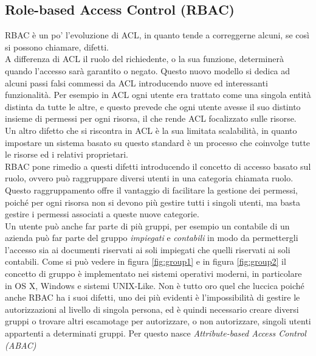 \subsection{Role-based Access Control (RBAC)} %
\label{sub:role_based_access_control}

RBAC è un po' l'evoluzione di ACL, in quanto tende a correggerne alcuni, se così si possono chiamare, difetti.\\
A differenza di ACL il ruolo del richiedente, o la sua funzione, determinerà quando l'accesso sarà garantito o negato.
Questo nuovo modello si dedica ad alcuni passi falsi commessi da ACL introducendo nuove ed interessanti funzionalità. Per esempio in ACL ogni utente era trattato come una singola entità distinta da tutte le altre, e questo prevede che ogni utente avesse il suo distinto insieme di permessi per ogni risorsa, il che rende ACL focalizzato sulle risorse.\\
Un altro difetto che si riscontra in ACL è la sua limitata scalabilità, in quanto 
impostare un sistema basato su questo standard è un processo che coinvolge tutte le risorse ed i relativi proprietari.\\
RBAC pone rimedio a questi difetti introducendo il concetto di accesso basato sul ruolo, ovvero può raggruppare diversi utenti in una categoria chiamata ruolo. 
Questo raggruppamento offre il vantaggio di facilitare la gestione dei permessi, poiché per ogni risorsa non si devono più gestire tutti i singoli utenti, ma basta gestire i permessi associati a queste nuove categorie.\\
Un utente può anche far parte di più gruppi, per esempio un contabile di un azienda può far parte del gruppo \textit{impiegati} e \textit{contabili} in modo da permettergli l'accesso sia ai documenti riservati ai soli impiegati che quelli riservati ai soli contabili.
Come si può vedere in figura \ref{fig:group1} e in figura \ref{fig:group2} il concetto di gruppo è implementato nei sistemi operativi moderni, in particolare in OS X, Windows e sistemi UNIX-Like.
Non è tutto oro quel che luccica poiché anche RBAC ha i suoi difetti, uno dei più evidenti è l'impossibilità di gestire le autorizzazioni al livello di singola persona, ed è quindi necessario creare diversi gruppi o trovare altri escamotage per autorizzare, o non autorizzare, singoli utenti appartenti a determinati gruppi. Per questo nasce \textit{Attribute-based Access Control (ABAC)}


